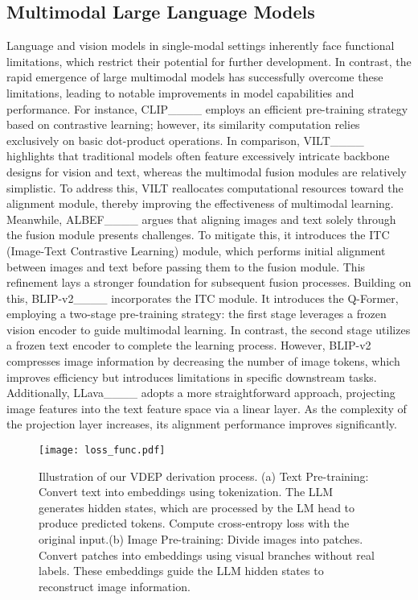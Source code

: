\subsection{Multimodal Large Language Models}
Language and vision models in single-modal settings inherently face functional limitations, which restrict their potential for further development. In contrast, the rapid emergence of large multimodal models has successfully overcome these limitations, leading to notable improvements in model capabilities and performance. For instance, CLIP____ employs an efficient pre-training strategy based on contrastive learning; however, its similarity computation relies exclusively on basic dot-product operations. In comparison, VILT____ highlights that traditional models often feature excessively intricate backbone designs for vision and text, whereas the multimodal fusion modules are relatively simplistic. To address this, VILT reallocates computational resources toward the alignment module, thereby improving the effectiveness of multimodal learning. Meanwhile, ALBEF____ argues that aligning images and text solely through the fusion module presents challenges. To mitigate this, it introduces the ITC (Image-Text Contrastive Learning) module, which performs initial alignment between images and text before passing them to the fusion module. This refinement lays a stronger foundation for subsequent fusion processes. Building on this, BLIP-v2____ incorporates the ITC module. It introduces the Q-Former, employing a two-stage pre-training strategy: the first stage leverages a frozen vision encoder to guide multimodal learning. In contrast, the second stage utilizes a frozen text encoder to complete the learning process. However, BLIP-v2 compresses image information by decreasing the number of image tokens, which improves efficiency but introduces limitations in specific downstream tasks. Additionally, LLava____ adopts a more straightforward approach, projecting image features into the text feature space via a linear layer. As the complexity of the projection layer increases, its alignment performance improves significantly.
\begin{figure*}[ht]
\vskip 0.2in
\begin{center}
\centerline{\texttt{[image: loss\_func.pdf]}}
\caption{Illustration of our VDEP derivation process.
(a) Text Pre-training: Convert text into embeddings using tokenization. The LLM generates hidden states, which are processed by the LM head to produce predicted tokens. Compute cross-entropy loss with the original input.(b) Image Pre-training: Divide images into patches. Convert patches into embeddings using visual branches without real labels. These embeddings guide the LLM hidden states to reconstruct image information.}
\label{VDEP_derivation}
\end{center}
\vskip -0.2in
\end{figure*}



